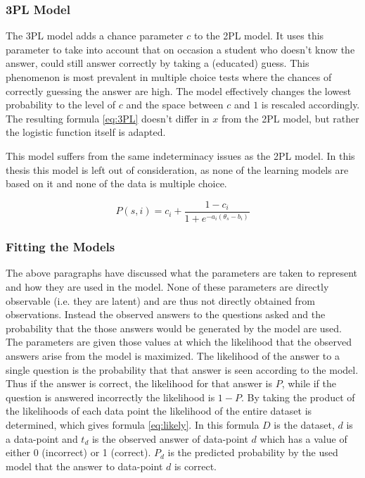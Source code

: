 \documentclass{scrartcl}
\begin{document}
\subsubsection{3PL Model}
The 3PL model adds a chance parameter $c$ to the 2PL model. It uses this parameter to take into account that on occasion a student who doesn't know the answer, could still answer correctly by taking a (educated) guess. This phenomenon is most prevalent in multiple choice tests where the chances of correctly guessing the answer are high. The model effectively changes the lowest probability to the level of $c$ and the space between $c$ and $1$ is rescaled accordingly. The resulting formula \ref{eq:3PL} doesn't differ in $x$ from the 2PL model, but rather the logistic function itself is adapted. 

This model suffers from the same indeterminacy issues as the 2PL model. In this thesis this model is left out of consideration, as none of the learning models are based on it and none of the data is multiple choice.

\begin{equation}
\label{eq:3PL}
P(s,i)= c_{i} + \frac{1-c_{i}}{1+e^{-a_{i}(\theta_{s} - b_{i})}}
\end{equation}

\subsubsection{Fitting the Models}
The above paragraphs have discussed what the parameters are taken to represent and how they are used in the model. None of these parameters are directly observable (i.e. they are latent) and are thus not directly obtained from observations. Instead the observed answers to the questions asked and the probability that the those answers would be generated by the model are used. The parameters are given those values at which the likelihood that the observed answers arise from the model is maximized. The likelihood of the answer to a single question is the probability that that answer is seen according to the model. Thus if the answer is correct, the likelihood for that answer is $P$, while if the question is answered incorrectly the likelihood is $1-P$. By taking the product of the likelihoods of each data point the likelihood of the entire dataset is determined, which gives formula \ref{eq:likely}. In this formula $D$ is the dataset, $d$ is a data-point and $t_{d}$ is the observed answer of data-point $d$ which has a value of either 0 (incorrect) or 1 (correct). $P_{d}$ is the predicted probability by the used model that the answer to data-point $d$ is correct.
\end{document}
